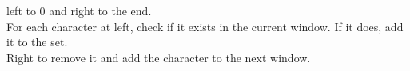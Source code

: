 \documentclass[preview]{standalone}
\begin{document}
left to 0 and right to the end.\\For each character at left, check if it exists in the current window. If it does, add it to the set.\\Right to remove it and add the character to the next window.\\
\end{document}
